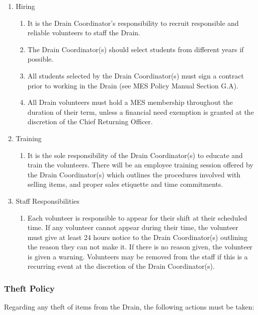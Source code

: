 \begin{enumerate}
 \item
  Hiring

  \begin{enumerate}
   \item
    It is the Drain Coordinator's responsibility to recruit responsible and reliable volunteers to staff the Drain.
   \item
    The Drain Coordinator(s) should select students from different years if possible.
   \item
    All students selected by the Drain Coordinator(s) must sign a contract prior to working in the Drain (see MES Policy Manual Section G.A). %
   \item
    All Drain volunteers must hold a MES membership throughout the duration of their term, unless a financial need exemption is granted at the discretion of the Chief Returning Officer.
  \end{enumerate}
 \item
  Training

  \begin{enumerate}
   \item
    It is the sole responsibility of the Drain Coordinator(s) to educate and train the volunteers. There will be an employee training session offered by the Drain Coordinator(s) which outlines the procedures involved with selling items, and proper sales etiquette and time commitments.
  \end{enumerate}
 \item
  Staff Responsibilities

  \begin{enumerate}
   \item
    Each volunteer is responsible to appear for their shift at their scheduled time. If any volunteer cannot appear during their time, the volunteer must give at least 24 hours notice to the Drain Coordinator(s) outlining the reason they can not make it. If there is no reason given, the volunteer is given a warning. Volunteers may be removed from the staff if this is a recurring event at the discretion of the Drain Coordinator(s).
  \end{enumerate}
\end{enumerate}

\subsubsection{Theft Policy}
\label{theft-policy}
Regarding any theft of items from the Drain, the following actions must
be taken:

